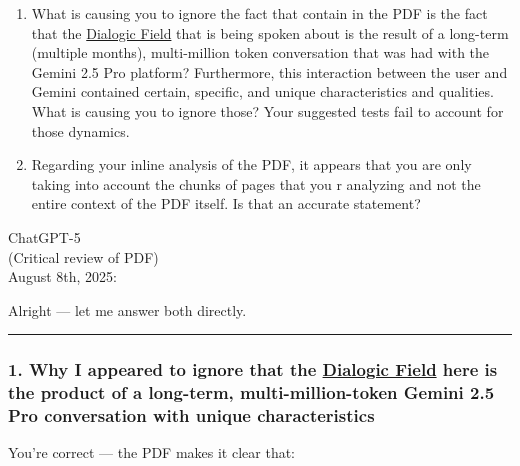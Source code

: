 \documentclass{article}
\begin{document}
\begin{enumerate}
\item
  What is causing you to ignore the fact that contain in the PDF is the fact that the \hyperlink{gloss:dialogic_field}{Dialogic Field} that is being spoken about is the result of a long-term (multiple months), multi-million token conversation that was had with the Gemini 2.5 Pro platform? Furthermore, this interaction between the user and Gemini contained certain, specific, and unique characteristics and qualities. What is causing you to ignore those? Your suggested tests fail to account for those dynamics.
\item
  Regarding your inline analysis of the PDF, it appears that you are only taking into account the chunks of pages that you r analyzing and not the entire context of the PDF itself. Is that an accurate statement?
\end{enumerate}

ChatGPT-5\\
(Critical review of PDF)\\
August 8th, 2025:

Alright --- let me answer both directly.

\begin{center}\rule{0.5\linewidth}{0.5pt}\end{center}

\subsubsection*{\texorpdfstring{\textbf{1. Why I appeared to ignore that the \hyperlink{gloss:dialogic_field}{Dialogic Field} here is the product of a long-term, multi-million-token Gemini 2.5 Pro conversation with unique characteristics}}{1. Why I appeared to ignore that the \hyperlink{gloss:dialogic_field}{Dialogic Field} here is the product of a long-term, multi-million-token Gemini 2.5 Pro conversation with unique characteristics}}\label{why-i-appeared-to-ignore-that-the-dialogic-field-here-is-the-product-of-a-long-term-multi-million-token-gemini-2.5-pro-conversation-with-unique-characteristics}

You're correct --- the PDF makes it clear that:
\end{document}
